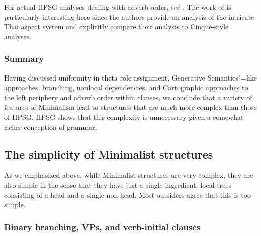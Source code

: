 \documentclass[output=paper
	        ,collection
	        ,collectionchapter
 	        ,biblatex
                ,babelshorthands
                ,newtxmath
                ,draftmode
                ,colorlinks, citecolor=brown
]{langscibook}
\begin{document}
For actual HPSG analyses dealing with adverb order, see .
The work of \citet{KM2005a} is particularly interesting here since the authors provide an analysis of the
intricate Thai aspect system and explicitly compare their analysis to Cinque-style analyses.


\subsubsection{Summary}

Having discussed uniformity in theta role assignment, Generative Semantics"=like approaches,
branching, nonlocal dependencies, and Cartographic approaches to the left periphery and adverb 
order within clauses,  we conclude that a variety of features of Minimalism lead to structures that
are much more complex than those of HPSG. HPSG shows that this complexity is unnecessary given a
somewhat richer conception of grammar. 

\subsection{The simplicity of Minimalist structures}
\label{subsec:min-simplicity}

As we emphasized above, while Minimalist structures are very complex, they are also simple in the
sense that they have just a single ingredient, local trees consisting of a head and a single
non-head. Most outsiders agree that this is too simple.

\subsubsection{Binary branching, VPs, and verb-initial clauses}
\end{document}

